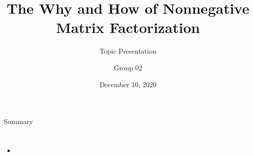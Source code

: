 \documentclass[aspectratio=43]{beamer}
\title[Nonnegative Matrix Factorization]{The Why and How of Nonnegative Matrix Factorization} %
\subtitle{Topic Presentation}
\author[Group 02]{Group 02}
\institute[LINMA2380]{
    LINMA2380 --- Matrix computations
} %
\date{December 10, 2020}
\begin{document}
    
    \frame{\titlepage}
    
    
    
    \begin{frame}{Summary}
        \tableofcontents
    \end{frame}
	
    \section{}
        \begin{frame}{}
        \begin{itemize}
            \item<1-> 
        \end{itemize}
        \end{frame}
\end{document}
